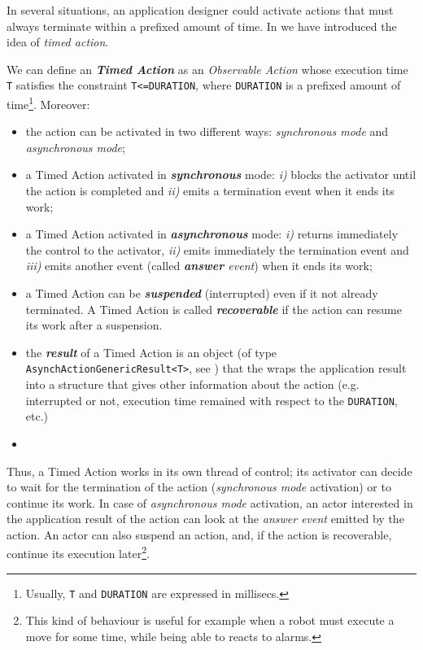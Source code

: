 In several situations, an application designer could activate actions that must always terminate within a prefixed amount of time. In  we have introduced the idea of \textit{timed action}.

We can define an \textit{\textbf{Timed Action}} as an \textit{Observable Action} whose execution time \texttt{T} satisfies the constraint \texttt{T<=DURATION}, where \texttt{DURATION} is a prefixed amount of time\footnote{Usually, \texttt{T} and \texttt{DURATION} are expressed in millisecs.}. Moreover:
\begin{itemize}
\item the action can be activated in two different ways: \textit{synchronous mode} and \textit{asynchronous mode};
\item a Timed Action activated in  \textit{\textbf{synchronous}} mode: \textit{i)} blocks the activator until the action is completed and \textit{ii)} emits a termination event when it ends its work;
\item a Timed Action activated in  \textit{\textbf{asynchronous}} mode:  \textit{i)} returns immediately the control to the activator, \textit{ii)} emits immediately the termination event and \textit{iii)} emits another event (called \textit{\textbf{answer} event}) when it ends its work;
\item a Timed Action can be \textit{\textbf{suspended}} (interrupted) even if it not already terminated. A Timed Action is called \textbf{\textit{recoverable}} if the action can resume its work after a suspension.
\item the \textit{\textbf{result}} of a Timed Action is an object (of type \texttt{AsynchActionGenericResult<T>}, see ) that the wraps the application result into a structure that gives other information about the action (e.g. interrupted or not, execution time remained with respect to the \texttt{DURATION}, etc.)
 \item 
\end{itemize}

Thus, a Timed Action works in its own thread of control; its activator can decide to wait for the termination of the action (\textit{synchronous mode} activation) or to continue its work. In case of \textit{asynchronous mode} activation, an actor interested in the application result of the action can look at the \textit{answer event} emitted by the action. An actor can also suspend an action, and, if the action is recoverable, continue its execution later\footnote{This kind of behaviour is useful for example  when a robot must execute a move for some time, while being able to reacts to alarms.}. 

